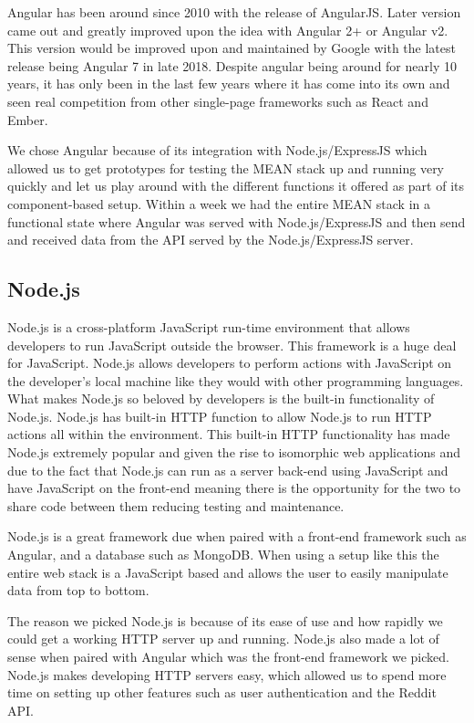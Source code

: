 Angular has been around since 2010 with the release of AngularJS. Later version came out and greatly improved upon the idea with Angular 2+ or Angular v2. This version would be improved upon and maintained by Google with the latest release being Angular 7 in late 2018. Despite angular being around for nearly 10 years, it has only been in the last few years where it has come into its own and seen real competition from other single-page frameworks such as React and Ember.

We chose Angular because of its integration with Node.js/ExpressJS which allowed us to get prototypes for testing the MEAN stack up and running very quickly and let us play around with the different functions it offered as part of its component-based setup. Within a week we had the entire MEAN stack in a functional state where Angular was served with Node.js/ExpressJS and then send and received data from the API served by the Node.js/ExpressJS server.

\subsection{Node.js}
Node.js is a cross-platform JavaScript run-time environment that allows developers to run JavaScript outside the browser. This framework is a huge deal for JavaScript. Node.js allows developers to perform actions with JavaScript on the developer's local machine like they would with other programming languages. What makes Node.js so beloved by developers is the built-in functionality of Node.js. Node.js has built-in HTTP function to allow Node.js to run HTTP actions all within the environment. This built-in HTTP functionality has made Node.js extremely popular and given the rise to isomorphic web applications and due to the fact that Node.js can run as a server back-end using JavaScript and have JavaScript on the front-end meaning there is the opportunity for the two to share code between them reducing testing and maintenance.

Node.js is a great framework due when paired with a front-end framework such as Angular, and a database such as MongoDB. When using a setup like this the entire web stack is a JavaScript based and allows the user to easily manipulate data from top to bottom.

The reason we picked Node.js is because of its ease of use and how rapidly we could get a working HTTP server up and running. Node.js also made a lot of sense when paired with Angular which was the front-end framework we picked. Node.js makes developing HTTP servers easy, which allowed us to spend more time on setting up other features such as user authentication and the Reddit API. 

